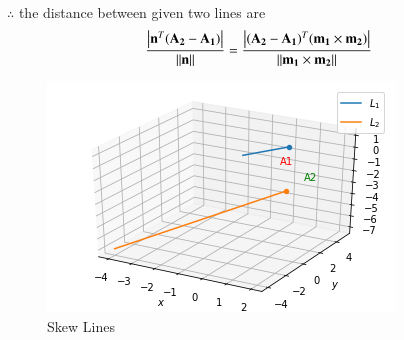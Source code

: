 \documentclass[journal,12pt,twocolumn]{IEEEtran}
\begin{document}
\\
$\therefore$ the distance between given two lines are
\begin{align}
\frac{\left\vert\mathbf{n}^T(\mathbf{A_2}-\mathbf{A_1})\right\vert}{\left\lVert\mathbf{n}\right\rVert} = \frac{\left\vert(\mathbf{A_2}-\mathbf{A_1})^T(\mathbf{m_1} \times \mathbf{ m_2})\right\vert}{\left\lVert\mathbf{m_1} \times \mathbf{m_2}\right\rVert}
\end{align}
\begin{figure}[!ht]
\centering
\includegraphics[width=\columnwidth]{download (7).png}
\caption{Skew Lines}
\label{fig: Skew Lines}	
\end{figure}
\end{document}
